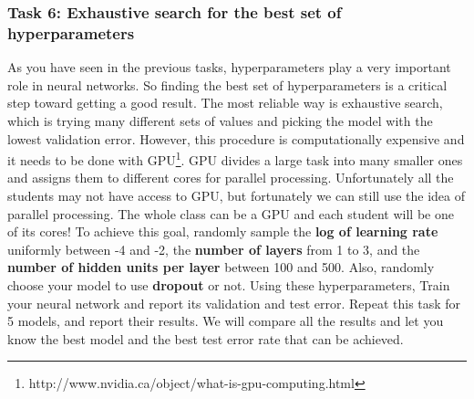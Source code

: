 \documentclass[12pt]{article}
\begin{document}
\subsubsection*{Task 6: Exhaustive search for the best set of hyperparameters}
As you have seen in the previous tasks, hyperparameters play a very important role in neural networks. So finding the best set of hyperparameters is a critical step toward getting a good result. The most reliable way is exhaustive search, which is trying many different sets of values and picking the model with the lowest validation error. However, this procedure is computationally expensive and it needs to be done with GPU\footnote{http://www.nvidia.ca/object/what-is-gpu-computing.html}. GPU divides a large task into many smaller ones and assigns them to different cores for parallel processing. Unfortunately all the students may not have access to GPU, but fortunately we can still use the idea of parallel processing. The whole class can be a GPU and each student will be one of its cores!
To achieve this goal, randomly sample the \textbf{log of learning rate} uniformly between -4 and -2, the \textbf{number of layers} from 1 to 3, and the \textbf{number of hidden units per layer} between 100 and 500. Also, randomly choose your model to use \textbf{dropout} or not. Using these hyperparameters, Train your neural network and report its validation and test error. Repeat this task for 5 models, and report their results.
We will compare all the results and let you know the best model and the best test error rate that can be achieved.
\end{document}
